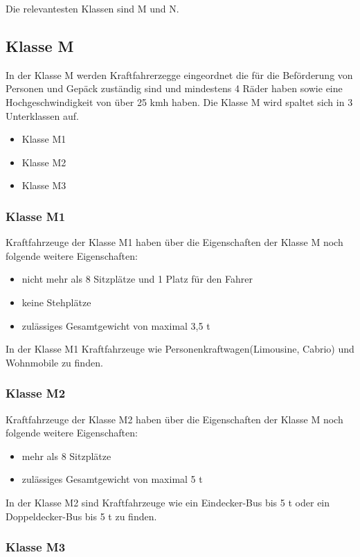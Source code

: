 Die relevantesten Klassen sind M und N.

\subsection{Klasse M}
In der Klasse M werden Kraftfahrerzegge eingeordnet die für die Beförderung von Personen und Gepäck zuständig sind und mindestens 4 Räder haben sowie eine Hochgeschwindigkeit von über 25 \ac{kmh} haben.
\newline
Die Klasse M wird spaltet sich in 3 Unterklassen auf.
\begin{itemize}
	\item {Klasse M1}
	\item {Klasse M2}
	\item {Klasse M3}
\end{itemize}
\subsubsection{Klasse M1}
Kraftfahrzeuge der Klasse M1 haben über die Eigenschaften der Klasse M noch folgende weitere Eigenschaften:
\begin{itemize}
	\item {nicht mehr als 8 Sitzplätze und 1 Platz für den Fahrer}
	\item {keine Stehplätze}
	\item {zulässiges Gesamtgewicht von maximal 3,5 \ac{t}}
\end{itemize}

In der Klasse M1 Kraftfahrzeuge wie Personenkraftwagen(Limousine, Cabrio) und Wohnmobile zu finden.

\subsubsection{Klasse M2}
Kraftfahrzeuge der Klasse M2 haben über die Eigenschaften der Klasse M noch folgende weitere Eigenschaften:
\begin{itemize}
	\item {mehr als 8 Sitzplätze}
	\item {zulässiges Gesamtgewicht von maximal 5 \ac{t}}
\end{itemize}

In der Klasse M2 sind Kraftfahrzeuge wie ein Eindecker-Bus bis 5 \ac{t} oder ein Doppeldecker-Bus bis 5 \ac{t} zu finden.

\subsubsection{Klasse M3}

